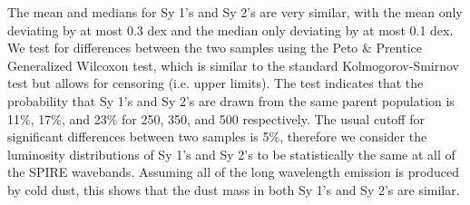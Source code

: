 The mean and medians for Sy 1's and Sy 2's are very similar, with the mean only deviating by at most 0.3 dex and the median only deviating by at most 0.1 dex. We test for differences between the two samples using the Peto \& Prentice Generalized Wilcoxon test, which is similar to the standard Kolmogorov-Smirnov test but allows for censoring (i.e. upper limits). The test indicates that the probability that Sy 1's and Sy 2's are drawn from the same parent population is 11\%, 17\%, and 23\% for 250, 350, and 500 \um{} respectively. The usual cutoff for significant differences between two samples is 5\%, therefore we consider the luminosity distributions of Sy 1's and Sy 2's to be statistically the same at all of the SPIRE wavebands. Assuming all of the long wavelength emission is produced by cold dust, this shows that the dust mass in both Sy 1's and Sy 2's are similar. 
  
  
  